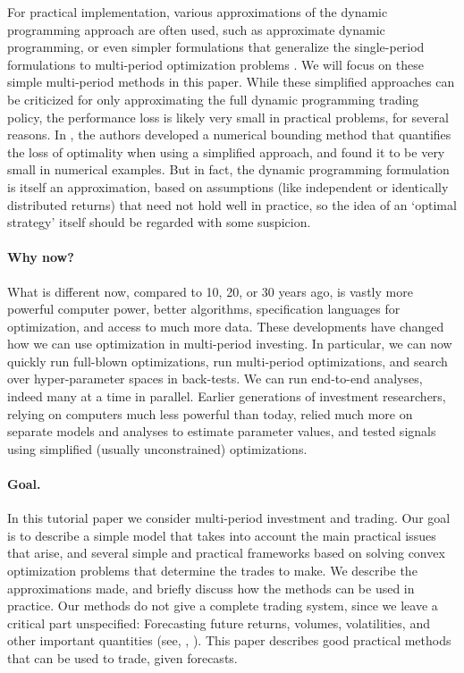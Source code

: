 \documentclass[openany]{now}
\begin{document}
For practical implementation, various approximations of the
dynamic programming approach are often used,
such as approximate dynamic programming,
or even simpler formulations that generalize the
single-period formulations to multi-period optimization problems
\cite{boyd2014performance}.
We will focus on these simple multi-period methods in this paper.
While these simplified approaches can be criticized for only
approximating the full dynamic programming trading policy,
the performance loss is likely very small in practical problems,
for several reasons.
In \cite{boyd2014performance}, the authors developed a numerical bounding
method that quantifies the loss of optimality when using a simplified
approach, and found it to be very small in numerical examples.
But in fact, the dynamic programming formulation is
itself an approximation, based on assumptions (like independent
or identically distributed returns) that need not hold well
in practice, so the idea of an `optimal strategy' itself
should be regarded with some suspicion.

\paragraph{Why now?}
What is different now, compared to 10, 20, or 30 years ago,
is vastly more powerful computer power, better algorithms,
specification languages for optimization, and access to much more
data.
These developments have changed
how we can use optimization in multi-period investing.  In
particular, we can now quickly run full-blown optimizations, run multi-period
optimizations, and search over hyper-parameter spaces in back-tests.  We can run
end-to-end analyses, indeed many at a time in parallel.
Earlier generations of investment researchers, relying on
computers much less powerful than today, relied much more on separate models
and analyses to estimate parameter values, and tested signals using simplified
(usually unconstrained) optimizations.

\paragraph{Goal.}
In this tutorial paper we consider multi-period investment and trading.
Our goal is to describe a simple model that takes into account
the main practical issues that arise,
and several simple and practical frameworks
based on solving convex optimization problems \cite{boyd2004convex} that determine
the trades to make.
We describe the approximations made, and briefly discuss how the methods
can be used in practice.
Our methods do not give a complete trading system,
since we leave a critical part unspecified:
Forecasting future returns, volumes, volatilities, and other important
quantities (see, \eg, \cite{grinold1999active}).
This paper describes good practical methods that can be used to trade, given forecasts.
\end{document}

